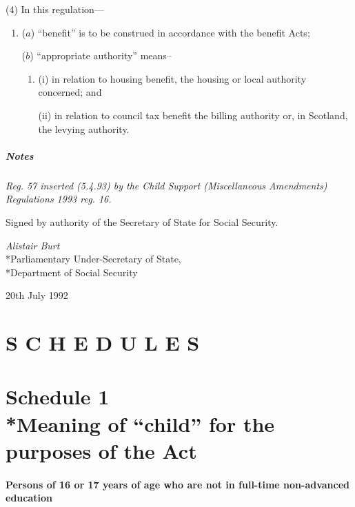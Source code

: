 \documentclass[a4paper]{article}
\newcommand{\parthead}{}
\newcommand\amendment[1]{\subsubsection*{Notes}{\itshape\frenchspacing\footnotesize #1 \par}}
\begin{document}
(4) In this regulation---
\begin{enumerate}\item[]
($a$) “benefit” is to be construed in accordance with the benefit Acts;

($b$) “appropriate authority” means–
\begin{enumerate}\item[]
(i) in relation to housing benefit, the housing or local authority concerned; and

(ii) in relation to council tax benefit the billing authority or, in Scotland, the levying authority.
\end{enumerate}
\end{enumerate}

\amendment{
Reg. 57 inserted (5.4.93) by the Child Support (Miscellaneous Amendments) Regulations 1993 reg. 16.
}

\bigskip

Signed by authority of the Secretary of State for Social Security.

{\raggedleft
\emph{Alistair Burt}\\*Parliamentary Under-Secretary of State,\\*Department of Social Security

}

20th July 1992

\clearpage

\part*{S C H E D U L E S}

\part[Schedule 1 --- Meaning of ``child'' for the purposes of the Act]{Schedule 1\\*Meaning of ``child'' for the purposes of the Act}

\renewcommand\parthead{--- Schedule 1}

\subsection*{Persons of 16 or 17 years of age who are not in full-time non-advanced education}
\end{document}
